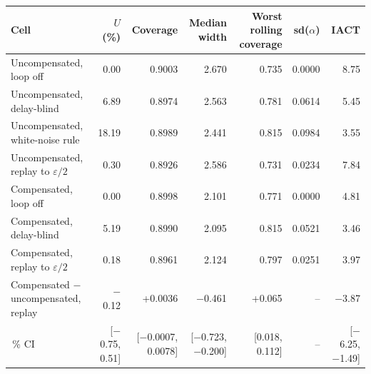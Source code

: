 \begin{tabular}{@{}lrrrrrr@{}}
\toprule
Cell & $U$ (\%) & Coverage & Median width & Worst rolling coverage & sd($\alpha$) & IACT \\
\midrule
Uncompensated, loop off & 0.00 & 0.9003 & 2.670 & 0.735 & 0.0000 & 8.75 \\
Uncompensated, delay-blind & 6.89 & 0.8974 & 2.563 & 0.781 & 0.0614 & 5.45 \\
Uncompensated, white-noise rule & 18.19 & 0.8989 & 2.441 & 0.815 & 0.0984 & 3.55 \\
Uncompensated, replay to $\varepsilon/2$ & 0.30 & 0.8926 & 2.586 & 0.731 & 0.0234 & 7.84 \\
\addlinespace
Compensated, loop off & 0.00 & 0.8998 & 2.101 & 0.771 & 0.0000 & 4.81 \\
Compensated, delay-blind & 5.19 & 0.8990 & 2.095 & 0.815 & 0.0521 & 3.46 \\
Compensated, replay to $\varepsilon/2$ & 0.18 & 0.8961 & 2.124 & 0.797 & 0.0251 & 3.97 \\
\midrule
Compensated $-$ uncompensated, replay & $-$0.12 & +0.0036 & $-$0.461 & +0.065 & -- & $-$3.87 \\
\quad 95\,\% CI & [$-$0.75, 0.51] & [$-$0.0007, 0.0078] & [$-$0.723, $-$0.200] & [0.018, 0.112] & -- & [$-$6.25, $-$1.49] \\
\bottomrule
\end{tabular}
